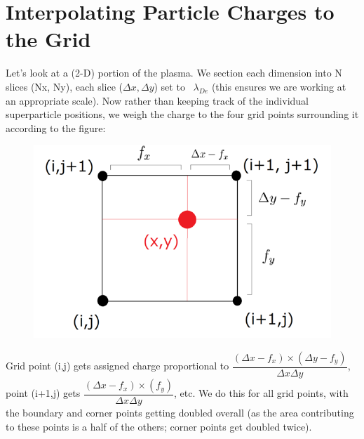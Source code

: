 \documentclass{article}
\begin{document}
\section{Interpolating Particle Charges to the Grid}
Let's look at a (2-D) portion of the plasma. We section each dimension into N slices (Nx, Ny), each slice ($\Delta x, \Delta y$) set to ~$\lambda_{De}$ (this ensures we are working at an appropriate scale). Now rather than keeping track of the individual superparticle positions, we weigh the charge to the four grid points surrounding it according to the figure: 
\begin{figure}[H]
\includegraphics[scale=0.7]{weigh.png}
\centering
\end{figure}
Grid point (i,j) gets assigned charge proportional to $\dfrac{(\Delta x - f_x)\times(\Delta y - f_y)}{\Delta x \Delta y}$, point (i+1,j) gets $\dfrac{(\Delta x - f_x)\times(f_y)}{\Delta x \Delta y}$, etc. We do this for all grid points, with the boundary and corner points getting doubled overall (as the area contributing to these points is a half of the others; corner points get doubled twice). \newline
\newline 
\end{document}
